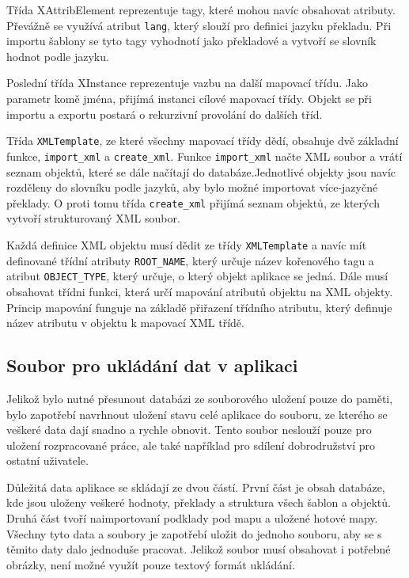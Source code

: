 \documentclass[thesis=B,czech]{resources/FITthesis}[2012/06/26]
\begin{document}
Třída XAttribElement reprezentuje tagy, které mohou navíc obsahovat atributy. Převážně se využívá atribut \texttt{lang}, který slouží pro definici jazyku překladu. Při importu šablony se tyto tagy vyhodnotí jako překladové a vytvoří se slovník hodnot podle jazyku. \par

Poslední třída XInstance reprezentuje vazbu na další mapovací třídu. Jako parametr komě jména, přijímá instanci cílové mapovací třídy. Objekt se při importu a exportu postará o rekurzivní provolání do dalších tříd. \par

Třída \texttt{XMLTemplate}, ze které všechny mapovací třídy dědí, obsahuje dvě základní funkce, \texttt{import\_xml} a \texttt{create\_xml}. Funkce \texttt{import\_xml} načte XML soubor a vrátí seznam objektů, které se dále načítají do databáze.Jednotlivé objekty jsou navíc rozděleny do slovníku podle jazyků, aby bylo možné importovat více-jazyčné překlady. O proti tomu třída \texttt{create\_xml} přijímá seznam objektů, ze kterých vytvoří strukturovaný XML soubor. \par

Každá definice XML objektu musí dědit ze třídy \texttt{XMLTemplate} a navíc mít definované třídní atributy \texttt{ROOT\_NAME}, který určuje název kořenového tagu a atribut \texttt{OBJECT\_TYPE}, který určuje, o který objekt aplikace se jedná. Dále musí obsahovat třídni funkci, která určí mapování atributů objektu na XML objekty. Princip mapování funguje na základě přiřazení třídního atributu, který definuje název atributu v objektu k mapovací XML třídě. 
	\subsection{Soubor pro ukládání dat v aplikaci}
Jelikož bylo nutné přesunout databázi ze souborového uložení pouze do paměti, bylo zapotřebí navrhnout uložení stavu celé aplikace do souboru, ze kterého se veškeré data dají  snadno a rychle obnovit. Tento soubor neslouží pouze pro uložení rozpracované práce, ale také například pro sdílení dobrodružství pro ostatní uživatele. \par

Důležitá data aplikace se skládají ze dvou částí. První část je obsah databáze, kde jsou uloženy veškeré hodnoty, překlady a struktura všech šablon a objektů. Druhá část tvoří naimportovaní podklady pod mapu a uložené hotové mapy. Všechny tyto data a soubory je zapotřebí uložit do jednoho souboru, aby se s těmito daty dalo jednoduše pracovat. Jelikož soubor musí obsahovat i potřebné obrázky, není možné využít pouze textový formát ukládání. \par
\end{document}
